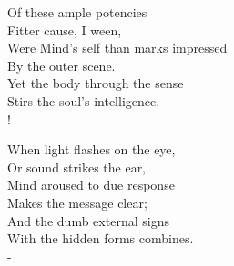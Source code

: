 \documentclass[12pt]{book}
\newenvironment{vpoem}[1]%
  {\def\poemvsindentlines{#1}\begin{poem}\small}%
  {\end{poem}\def\poemvsindentlines{\relax}}
\begin{document}
\begin{vpoem}{246}
    Of these ample potencies \\
      Fitter cause, I ween, \\
    Were Mind's self than marks impressed \\
      By the outer scene. \\
    Yet the body through the sense \\
    Stirs the soul's intelligence. \\!

    When light flashes on the eye, \\
      Or sound strikes the ear, \\
    Mind aroused to due response \\
      Makes the message clear; \\
    And the dumb external signs \\
    With the hidden forms combines. \\-
\end{vpoem}
\end{document}
